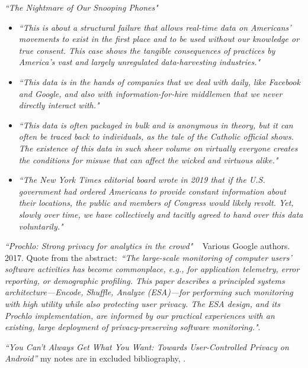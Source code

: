 \emph{``The Nightmare of Our Snooping Phones"}~
\begin{itemize}
    \item \emph{``This is about a structural failure that allows real-time data on Americans’ movements to exist in the first place and to be used without our knowledge or true consent. This case shows the tangible consequences of practices by America’s vast and largely unregulated data-harvesting industries."}
    \item \emph{``This data is in the hands of companies that we deal with daily, like Facebook and Google, and also with information-for-hire middlemen that we never directly interact with."}
    \item \emph{``This data is often packaged in bulk and is anonymous in theory, but it can often be traced back to individuals, as the tale of the Catholic official shows. The existence of this data in such sheer volume on virtually everyone creates the conditions for misuse that can affect the wicked and virtuous alike."}
    \item \emph{``The New York Times editorial board wrote in 2019 that if the U.S. government had ordered Americans to provide constant information about their locations, the public and members of Congress would likely revolt. Yet, slowly over time, we have collectively and tacitly agreed to hand over this data voluntarily."}
\end{itemize}


\emph{``Prochlo: Strong privacy for analytics in the crowd"}  ~\cite{prochlo2017_strong_privacy_analytics_in_the_crowd_46411} Various Google authors. 2017. Quote from the abstract:~\emph{``The large-scale monitoring of computer users' software activities has become commonplace, e.g., for application telemetry, error reporting, or demographic profiling. This paper describes a principled systems architecture---Encode, Shuffle, Analyze (ESA)---for performing such monitoring with high utility while also protecting user privacy. The ESA design, and its Prochlo implementation, are informed by our practical experiences with an existing, large deployment of privacy-preserving software monitoring."}.

\emph{``You Can't Always Get What You Want: Towards User-Controlled Privacy on Android''} my notes are in excluded bibliography, \cite{Caputo_2022}.

